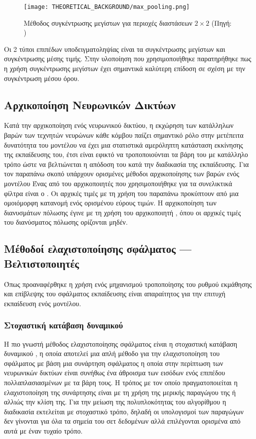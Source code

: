 \begin{figure}[H]
  \begin{center}
    \texttt{[image: THEORETICAL\_BACKGROUND/max\_pooling.png]}
    \caption{Μέθοδος συγκέντρωσης μεγίστων για περιοχές διαστάσεων $2\times2$ (Πηγή: \href{https://computersciencewiki.org/index.php/Max-pooling_/_Pooling}{})}
  \end{center}
\end{figure}

Οι 2 τύποι επιπέδων υποδειγματοληψίας είναι τα συγκέντρωσης μεγίστων και συγκέντρωσης μέσης τιμής. Στην υλοποίηση που χρησιμοποιήθηκε παρατηρήθηκε πως η χρήση συγκέντρωσης μεγίστων έχει σημαντικά καλύτερη επίδοση σε σχέση με την συγκέντρωση μέσου όρου.

\subsection{Αρχικοποίηση Νευρωνικών Δικτύων}
Κατά την αρχικοποίηση ενός νευρωνικού δικτύου, η εκχώρηση των κατάλληλων βαρών των τεχνητών νευρώνων κάθε κόμβου παίζει σημαντικό ρόλο στην μετέπειτα δυνατότητα του μοντέλου να έχει μια στατιστικά αμερόληπτη κατάσταση εκκίνησης της εκπαίδευσης του, έτσι είναι εφικτό να τροποποιούνται τα βάρη του με κατάλληλο τρόπο ώστε να βελτιώνεται η απόδοση του κατά την διαδικασία της εκπαίδευσης.
Για τον παραπάνω σκοπό υπάρχουν ορισμένες μέθοδοι αρχικοποίησης των βαρών ενός μοντέλου
Ένας από του αρχικοποιητές που χρησιμοποιήθηκε για τα συνελικτικά φίλτρα είναι ο . Οι αρχικές τιμές με τη χρήση του παραπάνω προκύπτουν από μια ομοιόμορφη κατανομή ενός ορισμένου εύρους τιμών. Η αρχικοποίηση των διανυσμάτων πόλωσης έγινε με τη χρήση του αρχικοποιητή
 , όπου οι αρχικές τιμές του διανύσματος πόλωσης ορίζονται μηδέν.

\subsection{Μέθοδοί ελαχιστοποίησης σφάλματος --- Βελτιστοποιητές }
Όπως προαναφέρθηκε η χρήση ενός μηχανισμού τροποποίησης του ρυθμού εκμάθησης και επίβλεψης του σφάλματος εκπαίδευσης είναι απαραίτητος για την επιτυχή εκπαίδευση ενός μοντέλου. 
\subsubsection{Στοχαστική κατάβαση δυναμικού }
Η πιο γνωστή μέθοδος ελαχιστοποίησης σφάλματος είναι η στοχαστική κατάβαση δυναμικού , η οποία αποτελεί μια απλή μέθοδο για την ελαχιστοποίηση του σφάλματος με βάση μια συνάρτηση σφάλματος η οποία στην περίπτωση των νευρωνικών δικτύων είναι συνήθως ένα άθροισμα των εισόδων ενός επιπέδου πολλαπλασιασμένων με τα βάρη τους. Η τρόπος με τον οποίο πραγματοποιείται η ελαχιστοποίηση της συνάρτησης είναι με τη χρήση της μερικής παραγώγου της ή αλλιώς την κλίση της. Για την μείωση της πολυπλοκότητας του αλγορίθμου η διαδικασία εκτελείται με στοχαστικό τρόπο, δηλαδή οι υπολογισμοί των παραγώγων δεν γίνονται για όλα τα σημεία του σετ δεδομένων αλλά επιλέγονται ορισμένα από αυτά με έναν τυχαίο τρόπο.
